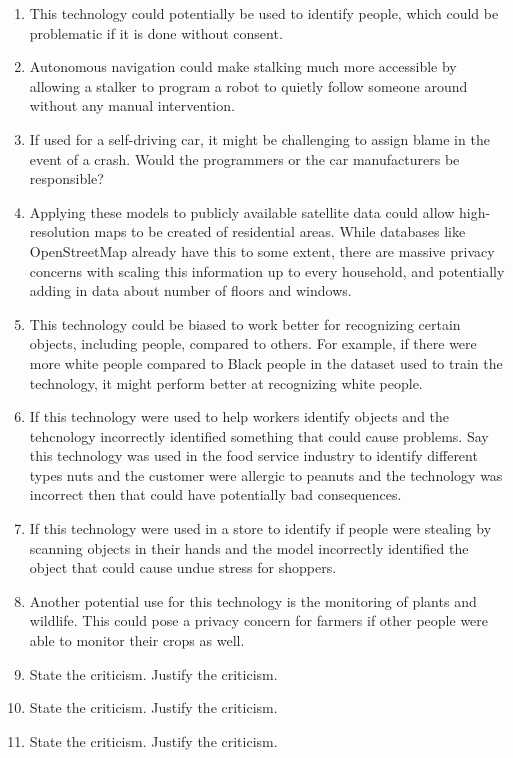 \begin{enumerate}
    \item This technology could potentially be used to identify people, which could be problematic if it is done without consent.
    \item Autonomous navigation could make stalking much more accessible by allowing a stalker to program a robot to quietly follow someone around without any manual intervention.
    \item If used for a self-driving car, it might be challenging to assign blame in the event of a crash. Would the programmers or the car manufacturers be responsible?
    \item Applying these models to publicly available satellite data could allow high-resolution maps to be created of residential areas. While databases like OpenStreetMap already have this to some extent, there are massive privacy concerns with scaling this information up to every household, and potentially adding in data about number of floors and windows.
    \item This technology could be biased to work better for recognizing certain objects, including people, compared to others. For example, if there were more white people compared to Black people in the dataset used to train the technology, it might perform better at recognizing white people.
    \item If this technology were used to help workers identify objects and the tehcnology incorrectly identified something that could cause problems. Say this technology was used in the food service industry to identify different types nuts and the customer were allergic to peanuts and the technology was incorrect then that could have potentially bad consequences. 
    \item If this technology were used in a store to identify if people were stealing by scanning objects in their hands and the model incorrectly identified the object that could cause undue stress for shoppers. 
    \item Another potential use for this technology is the monitoring of plants and wildlife. This could pose a privacy concern for farmers if other people were able to monitor their crops as well. 
    \item State the criticism. Justify the criticism.
    \item State the criticism. Justify the criticism.
    \item State the criticism. Justify the criticism.
\end{enumerate}


